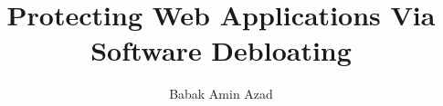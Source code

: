\documentclass[phd,bottom,nosig]{usbthesis}
\author{Babak Amin Azad}%
\title{Protecting Web Applications Via Software Debloating}%
\begin{document}
\singlespacing %
\maketitle %
\makeapproval %

\begin{abstract}

\end{abstract}

\pagebreak


\tableofcontents %
\listoffigures %
%
\listoftables %
%
\begin{acknowledgements}
    
\end{acknowledgements}
\pagestyle{thesis}
\newpage
{}







\renewcommand{\baselinestretch}{1}
\normalsize

\clearpage
\newpage
{}%
%


\clearpage
\newpage

\appendix


% 
%
\end{document}
